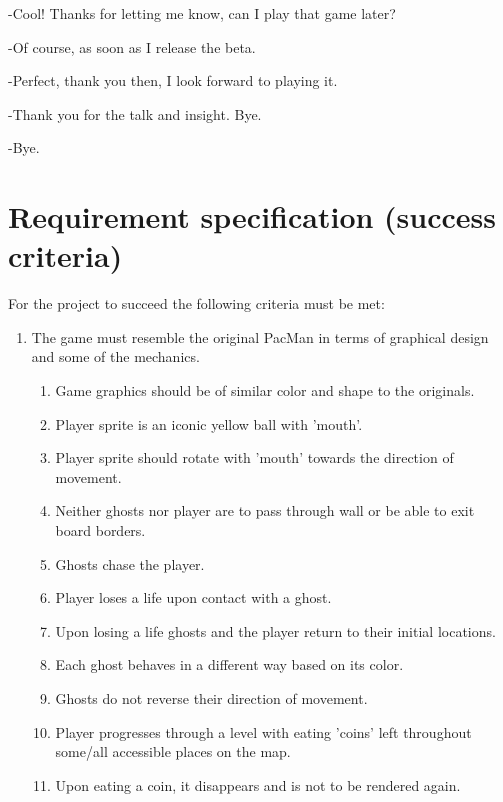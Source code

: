 \documentclass[11pt,a4paper]{report}
\begin{document}
			-Cool! Thanks for letting me know, can I play that game later?
			
			-Of course, as soon as I release the beta.
			
			-Perfect, thank you then, I look forward to playing it.
			
			-Thank you for the talk and insight. Bye.
			
			-Bye.
		\section{Requirement specification (success criteria)}
			For the project to succeed the following criteria must be met:\\
			\begin{enumerate}
				\item 
				The game must resemble the original PacMan in terms of graphical design and some of the mechanics.
				\begin{enumerate}
					\item
						Game graphics should be of similar color and shape to the originals.
						\label{req-orig-colors}
					\item
						Player sprite is an iconic yellow ball with 'mouth'.
						\label{req-player-shape}
					\item
						Player sprite should rotate with 'mouth' towards the direction of movement. 
						\label{req-player-rotation}
					\item
						Neither ghosts nor player are to pass through wall or be able to exit board borders.
						\label{req-walls-not-passable}
					\item
						Ghosts chase the player.
						\label{req-ghost-movement}
					\item
						Player loses a life upon contact with a ghost.
						\label{req-life-loss}
					\item
						Upon losing a life ghosts and the player return to their initial locations.
						\label{req-reset}
					\item
						Each ghost behaves in a different way based on its color.
						\label{req-ghost-differences}
					\item
						Ghosts do not reverse their direction of movement.
						\label{req-ghost-not-reversing}
					\item
						Player progresses through a level with eating 'coins' left throughout some/all accessible places on the map.
						\label{req-level-progress}
					\item
						Upon eating a coin, it disappears and is not to be rendered again.

\end{enumerate}
\end{enumerate}
\end{document}
